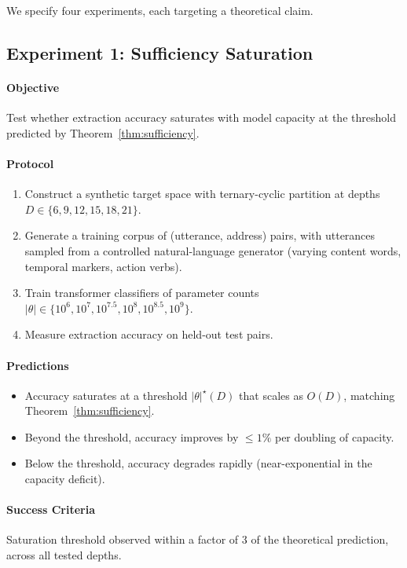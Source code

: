 \documentclass[11pt,a4paper]{article}
\theoremstyle{definition}
\theoremstyle{remark}
\begin{document}
We specify four experiments, each targeting a theoretical claim.

\subsection{Experiment 1: Sufficiency Saturation}

\paragraph{Objective} Test whether extraction accuracy saturates with model capacity at the threshold predicted by Theorem~\ref{thm:sufficiency}.

\paragraph{Protocol}
\begin{enumerate}
    \item Construct a synthetic target space with ternary-cyclic partition at depths $D \in \{6, 9, 12, 15, 18, 21\}$.
    \item Generate a training corpus of (utterance, address) pairs, with utterances sampled from a controlled natural-language generator (varying content words, temporal markers, action verbs).
    \item Train transformer classifiers of parameter counts $|\theta| \in \{10^6, 10^7, 10^{7.5}, 10^8, 10^{8.5}, 10^9\}$.
    \item Measure extraction accuracy on held-out test pairs.
\end{enumerate}

\paragraph{Predictions}
\begin{itemize}
    \item Accuracy saturates at a threshold $|\theta|^\star(D)$ that scales as $O(D)$, matching Theorem~\ref{thm:sufficiency}.
    \item Beyond the threshold, accuracy improves by $\leq 1\%$ per doubling of capacity.
    \item Below the threshold, accuracy degrades rapidly (near-exponential in the capacity deficit).
\end{itemize}

\paragraph{Success Criteria}
Saturation threshold observed within a factor of 3 of the theoretical prediction, across all tested depths.
\end{document}
